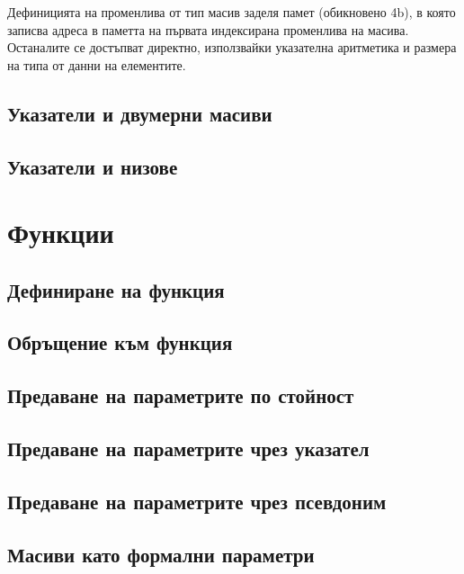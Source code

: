 \documentclass[fleqn,12pt]{article}
\begin{document}
Дефиницията на променлива от тип масив заделя памет (обикновено 4b), в която записва адреса в паметта на първата индексирана променлива на масива.
Останалите се достъпват директно, използвайки указателна аритметика и размера на типа от данни на елементите.

\subsection{Указатели и двумерни масиви}
\subsection{Указатели и низове}

\section{Функции}
\subsection{Дефиниране на функция}
\subsection{Обръщение към функция}
\subsection{Предаване на параметрите по стойност}
\subsection{Предаване на параметрите чрез указател}
\subsection{Предаване на параметрите чрез псевдоним}
\subsection{Масиви като формални параметри}
\end{document}
